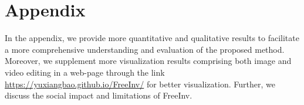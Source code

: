 \documentclass{article}
\begin{document}
{


}
















\newpage
\appendix
\section*{\LARGE\textbf Appendix}
In the appendix, we provide more quantitative and qualitative results to facilitate a more comprehensive understanding and evaluation of the proposed method.
Moreover, we supplement more visualization results comprising both image and video editing in a web-page through the link {\color{red}\href{https://yuxiangbao.github.io/FreeInv/}{https://yuxiangbao.github.io/FreeInv/}} for better visualization.
Further, we discuss the social impact and limitations of FreeInv.
\end{document}
